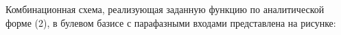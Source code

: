 Комбинационная схема, реализующая заданную функцию по аналитической 
форме (2), в булевом базисе с парафазными входами представлена  на  рисунке: 